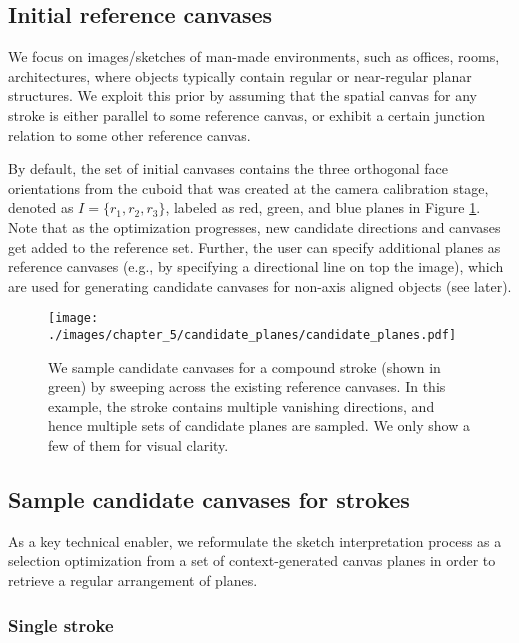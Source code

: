 {\subsection{Initial reference canvases}

We focus on images/sketches of man-made environments, such as offices, rooms, architectures, where objects typically contain regular or near-regular planar structures. We exploit this prior by assuming that the spatial canvas for any stroke is either parallel to some reference canvas, or exhibit a certain junction relation to some other reference canvas. %


By default, the set of initial canvases contains the three orthogonal face orientations from the cuboid that was created at the camera calibration stage, denoted as $I = \{r_1,r_2,r_3\}$, labeled as red, green, and blue planes in Figure \ref{fig:candidate_planes}. %
%
Note that as the optimization progresses, new candidate directions and canvases get added to the reference set.
%
Further, the user can specify additional planes as reference canvases (e.g., by specifying a directional line on top the image), which are used for generating candidate canvases for non-axis aligned objects (see later).

\begin{figure}[t!]
  \texttt{[image: ./images/chapter\_5/candidate\_planes/candidate\_planes.pdf]}
  \caption{We sample candidate canvases for a compound stroke (shown in green) by sweeping across the existing reference canvases. In this example, the stroke contains multiple vanishing directions, and hence multiple sets of candidate planes are sampled. We only show a few of them for visual clarity.}
  \label{fig:candidate_planes}
  \vnudge
\end{figure}


\subsection{Sample candidate canvases for strokes}

As a key technical enabler, we reformulate the sketch interpretation process as a selection optimization from a set of context-generated canvas planes in order to retrieve a regular arrangement of planes.

\subsubsection{Single stroke}

}
